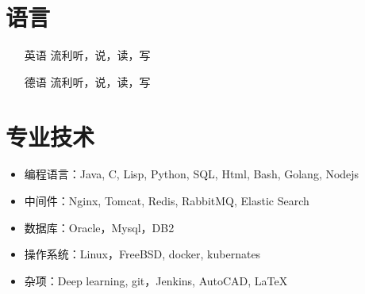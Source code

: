 \documentclass{res}
\begin{document}
\begin{CJK}{UTF8}{song}
\begin{resume}
  \section{语言}
  \begin{itemize}
  \item[{\CJKfamily{hei} 英语}] \hfill 流利听，说，读，写
  \item[{\CJKfamily{hei} 德语}]   \hfill 流利听，说，读，写
  \end{itemize}

  \section{专业技术}
  \begin{itemize}
  \item{ 编程语言}：Java, C, Lisp, Python, SQL, Html, Bash, Golang, Nodejs
  \item{ 中间件}：Nginx, Tomcat, Redis, RabbitMQ, Elastic Search
  \item{ 数据库}：Oracle，Mysql，DB2
  \item{ 操作系统}：Linux，FreeBSD, docker, kubernates
  \item{ 杂项}：Deep learning, git，Jenkins, AutoCAD, \LaTeX
  \end{itemize}

\end{resume}
\end{CJK}
\end{document}
